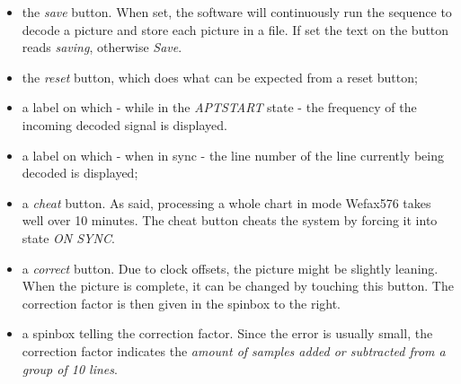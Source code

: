 \documentclass[11pt]{article}
\begin{document}
\begin{itemize}
\item the {\em save} button. When set, the software will continuously
run the sequence to decode a picture and store each picture in a file.
If set the text on the button reads {\em saving}, otherwise {\em Save}.
\item the {\em reset} button, which does what
can be expected from a reset button;
\item a label on which - while in the {\em APTSTART} state - the frequency
of the incoming decoded signal is displayed.
\item a label on which - when in sync - the line number
of the line currently being decoded is displayed;
\item a {\em cheat} button. As said, processing a whole chart in mode Wefax576
takes well over 10 minutes. The cheat button cheats the system by forcing
it into state {\em ON SYNC}.
\item a {\em correct} button. Due to clock offsets, the picture might be slightly leaning.
When the picture is complete, it can be changed by touching this button.
The correction factor is then given in the spinbox to the right.
\item a spinbox telling the correction factor. Since the error is usually
small, the correction factor indicates the {\em amount of samples added
or subtracted from a group of 10 lines}.
\end{itemize}
\end{document}
